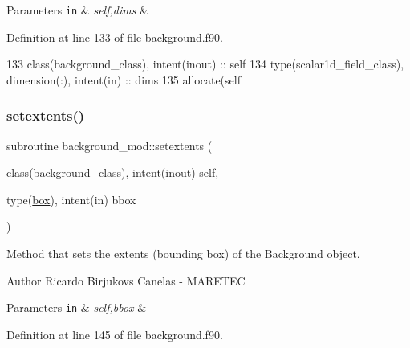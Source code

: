 \begin{DoxyParams}[1]{Parameters}
\mbox{\tt in}  & {\em self,dims} & \\
\hline
\end{DoxyParams}


Definition at line 133 of file background.\+f90.


\begin{DoxyCode}
133     \textcolor{keywordtype}{class}(background\_class), \textcolor{keywordtype}{intent(inout)} :: self
134     \textcolor{keywordtype}{type}(scalar1d\_field\_class), \textcolor{keywordtype}{dimension(:)}, \textcolor{keywordtype}{intent(in)} :: dims
135     \textcolor{keyword}{allocate}(self%
\end{DoxyCode}
\mbox{\label{namespacebackground__mod_ae8871564866fdd657a25f6a5a2256c33}} 
\subsubsection{\texorpdfstring{setextents()}{setextents()}}
{\footnotesize\ttfamily subroutine background\+\_\+mod\+::setextents (\begin{DoxyParamCaption}\item[{class(\mbox{\hyperlink{structbackground__mod_1_1background__class}{background\+\_\+class}}), intent(inout)}]{self,  }\item[{type(\mbox{\hyperlink{structgeometry__mod_1_1box}{box}}), intent(in)}]{bbox }\end{DoxyParamCaption})\hspace{0.3cm}{\ttfamily [private]}}



Method that sets the extents (bounding box) of the Background object. 

\begin{DoxyAuthor}{Author}
Ricardo Birjukovs Canelas -\/ M\+A\+R\+E\+T\+EC 
\end{DoxyAuthor}

\begin{DoxyParams}[1]{Parameters}
\mbox{\tt in}  & {\em self,bbox} & \\
\hline
\end{DoxyParams}


Definition at line 145 of file background.\+f90.



